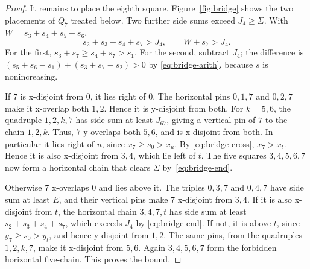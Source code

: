 \documentclass[12pt]{amsart}
\theoremstyle{definition}
\theoremstyle{remark}
\numberwithin{equation}{section}
\numberwithin{figure}{section}
\numberwithin{table}{section}
\begin{document}
\begin{proof}
It remains to place the eighth square.
Figure~\ref{fig:bridge} shows the two placements of $Q_7$ treated below.
Two further side sums exceed $J_4\ge\Sigma$. With $W=s_3+s_4+s_5+s_6$,
\begin{equation}\label{eq:bridge-end}
s_2+s_3+s_4+s_7>J_4,\qquad W+s_7>J_4.
\end{equation}
For the first, $s_3+s_7\ge s_4+s_7>s_1$. For the second, subtract $J_4$;
the difference is $(s_5+s_6-s_1)+(s_3+s_7-s_2)>0$ by
\eqref{eq:bridge-arith}, because $s$ is nonincreasing.

If $7$ is x-disjoint from $0$, it lies right of $0$. The horizontal pins
$0,1,7$ and $0,2,7$ make it x-overlap both $1,2$. Hence it is
y-disjoint from both. For $k=5,6$, the quadruple $1,2,k,7$ has side sum at least $J_{67}$, giving a
vertical pin of $7$ to the chain $1,2,k$. Thus, $7$ y-overlaps both $5,6$,
and is x-disjoint from both. In particular it lies right of $u$, since
$x_7\ge s_0>x_u$. By \eqref{eq:bridge-cross}, $x_7>x_t$. Hence it is also
x-disjoint from $3,4$, which lie left of $t$. The five squares
$3,4,5,6,7$ now form a horizontal chain that clears $\Sigma$
by~\eqref{eq:bridge-end}.

Otherwise $7$ x-overlaps $0$ and lies above it. The triples
$0,3,7$ and $0,4,7$ have side sum at least $E$, and their vertical pins make $7$
x-disjoint from $3,4$.
If it is also x-disjoint from $t$, the horizontal chain $3,4,7,t$ has side
sum at least $s_2+s_3+s_4+s_7$, which exceeds $J_4$ by \eqref{eq:bridge-end}. If not, it is above $t$, since
$y_7\ge s_0>y_t$, and hence y-disjoint from $1,2$. The same pins, from the quadruples $1,2,k,7$,
make it x-disjoint from $5,6$. Again $3,4,5,6,7$ form the forbidden
horizontal five-chain. This proves the bound.
\end{proof}
\end{document}
